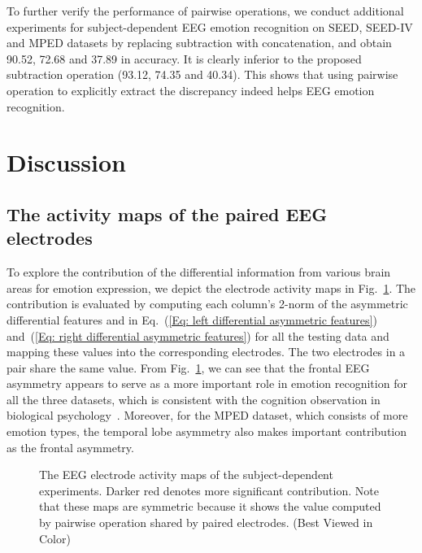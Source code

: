\documentclass[journal]{IEEEtran}
\begin{document}
To further verify the performance of pairwise operations, we conduct additional experiments for subject-dependent EEG emotion recognition on SEED, SEED-IV and MPED datasets by replacing subtraction with concatenation, and obtain 90.52, 72.68 and 37.89 in accuracy. It is clearly inferior to the proposed subtraction operation (93.12, 74.35 and 40.34). This shows that using pairwise operation to explicitly extract the discrepancy indeed helps EEG emotion recognition.


\section{Discussion}
\label{Sec: Discussion}
\subsection{The activity maps of the paired EEG electrodes}

To explore the contribution of the differential information from various brain areas for emotion expression, we depict the electrode activity maps in Fig.~\ref{Fig: The EEG electrode activity maps}. The contribution is evaluated by computing each column's 2-norm of the asymmetric differential features  and  in Eq.~(\ref{Eq: left differential asymmetric features}) and~(\ref{Eq: right differential asymmetric features}) for all the testing data and mapping these values into the corresponding electrodes. The two electrodes in a pair share the same value. From Fig.~\ref{Fig: The EEG electrode activity maps}, we can see that the frontal EEG asymmetry appears to serve as a more important role in emotion recognition for all the three datasets, which is consistent with the cognition observation in biological psychology~\cite{coan2004frontal}. Moreover, for the MPED dataset, which consists of more emotion types, the temporal lobe asymmetry also makes important contribution as the frontal asymmetry. 
\begin{figure}[htb]
	\centering
	\hspace{0.7cm}
	\hspace{0.7cm}
	\caption{The EEG electrode activity maps of the subject-dependent experiments. Darker red denotes more significant contribution. Note that these maps are symmetric because it shows the value computed by pairwise operation shared by paired electrodes. (Best Viewed in Color)}
	\label{Fig: The EEG electrode activity maps}
\end{figure}
\end{document}
